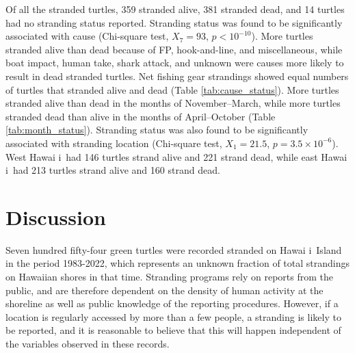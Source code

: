 \documentclass[sn-basic,NameDate]{sn-jnl}\usepackage[]{graphicx}\usepackage[]{xcolor}
\DeclareRobustCommand{\okina}{%
  \raisebox{\dimexpr\fontcharht\font`A-\height}{%
    \scalebox{0.8}{`}%
  }%
}
\newcommand{\Hawaii}{Hawai\okina i}
\begin{document}
Of all the stranded turtles, 
359 stranded alive, 
381 stranded dead, and 
14 turtles had no stranding status reported.
Stranding status was found to be significantly associated with cause 
(Chi-square test, $X_{7} = 93$,
$p < 10^{-10}$).
More turtles stranded alive than dead because of FP, hook-and-line, and miscellaneous, while boat impact, human take, shark attack, and unknown were causes more likely to result in dead stranded turtles. 
Net fishing gear strandings showed equal numbers of turtles that stranded alive and dead (Table \ref{tab:cause_status}).
More turtles stranded alive than dead in the months of November--March, while more turtles stranded dead than alive in the months of April--October (Table \ref{tab:month_status}).
Stranding status was also found to be significantly associated with stranding location (Chi-square test,
$X_{1} = 21.5$, 
$p = \ensuremath{3.5\times 10^{-6}}$).
West \Hawaii\ had
146 turtles strand alive and
221 strand dead, 
while east \Hawaii\ had 
213 turtles strand alive and
160 strand dead. 


\section{Discussion}

Seven hundred fifty-four green turtles were recorded stranded on \Hawaii\ Island in the period 1983-2022, which represents an unknown fraction of total strandings on Hawaiian shores in that time. 
Stranding programs rely on reports from the public, and are therefore dependent on the density of human activity at the shoreline as well as public knowledge of the reporting procedures.
However, if a location is regularly accessed by more than a few people, a stranding is likely to be reported, and it is reasonable to believe that this will happen independent of the variables observed in these records.
\end{document}
